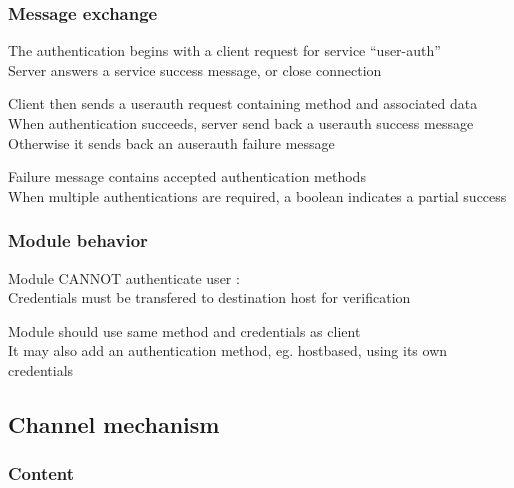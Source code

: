 \documentclass{beamer}
\begin{document}
\begin{frame}
\frametitle{Message exchange}
The authentication begins with a client request for service ``user-auth''\\
Server answers a service success message, or close connection\\

\vspace{8mm}

Client then sends a userauth request containing method and associated data\\
When authentication succeeds, server send back a userauth success message\\
Otherwise it sends back an auserauth failure message\\

\vspace{8mm}

Failure message contains accepted authentication methods\\
When multiple authentications are required, a boolean indicates a partial success

\end{frame}



\begin{frame}
\frametitle{Module behavior}

Module CANNOT authenticate user :\\
Credentials must be transfered to destination host for verification

\vspace{8mm}
Module should use same method and credentials as client\\
It may also add an authentication method, eg. hostbased, using its own credentials

\end{frame}



\subsection{Channel mechanism}

\begin{frame}
\frametitle{Content}
\tableofcontents[currentsubsection]
\end{frame}
\end{document}
